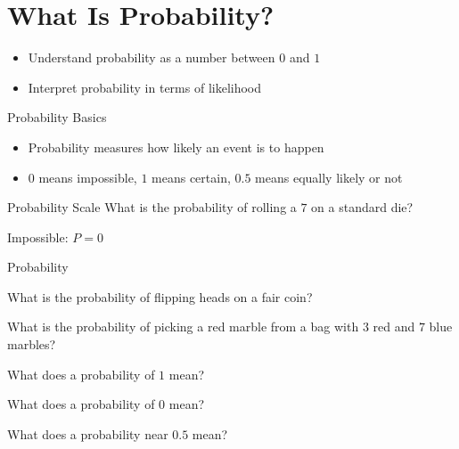 \section{What Is Probability?}

\begin{learningGoals}
\begin{itemize}
    \item Understand probability as a number between $0$ and $1$
    \item Interpret probability in terms of likelihood
\end{itemize}
\end{learningGoals}

\begin{conceptBox}{Probability Basics}
\begin{itemize}[leftmargin=*]
    \item Probability measures how likely an event is to happen
    \item $0$ means impossible, $1$ means certain, $0.5$ means equally likely or not
\end{itemize}
\end{conceptBox}

\begin{workedExample}{Probability Scale}
What is the probability of rolling a $7$ on a standard die?

Impossible: $P = 0$
\end{workedExample}


\begin{practiceBox}{Probability}
\resetProblems

\prob What is the probability of flipping heads on a fair coin?

\prob What is the probability of picking a red marble from a bag with $3$ red and $7$ blue marbles?

\prob What does a probability of $1$ mean?

\prob What does a probability of $0$ mean?

\prob What does a probability near $0.5$ mean?

\end{practiceBox}
